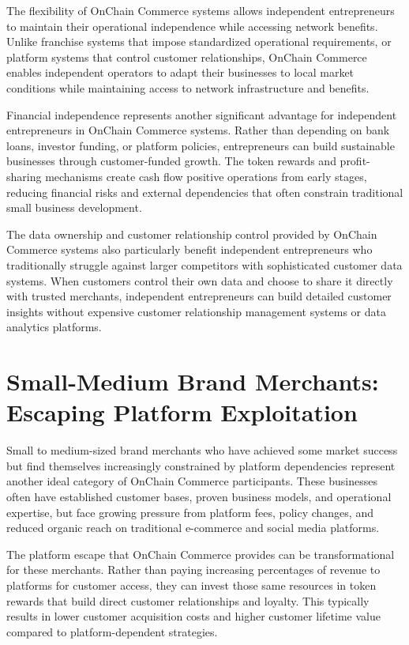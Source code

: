 \documentclass[
  Letterpaper,
]{scrbook}
\begin{document}
The flexibility of OnChain Commerce systems allows independent
entrepreneurs to maintain their operational independence while accessing
network benefits. Unlike franchise systems that impose standardized
operational requirements, or platform systems that control customer
relationships, OnChain Commerce enables independent operators to adapt
their businesses to local market conditions while maintaining access to
network infrastructure and benefits.

Financial independence represents another significant advantage for
independent entrepreneurs in OnChain Commerce systems. Rather than
depending on bank loans, investor funding, or platform policies,
entrepreneurs can build sustainable businesses through customer-funded
growth. The token rewards and profit-sharing mechanisms create cash flow
positive operations from early stages, reducing financial risks and
external dependencies that often constrain traditional small business
development.

The data ownership and customer relationship control provided by OnChain
Commerce systems also particularly benefit independent entrepreneurs who
traditionally struggle against larger competitors with sophisticated
customer data systems. When customers control their own data and choose
to share it directly with trusted merchants, independent entrepreneurs
can build detailed customer insights without expensive customer
relationship management systems or data analytics platforms.

\section{Small-Medium Brand Merchants: Escaping Platform
Exploitation}\label{small-medium-brand-merchants-escaping-platform-exploitation}

Small to medium-sized brand merchants who have achieved some market
success but find themselves increasingly constrained by platform
dependencies represent another ideal category of OnChain Commerce
participants. These businesses often have established customer bases,
proven business models, and operational expertise, but face growing
pressure from platform fees, policy changes, and reduced organic reach
on traditional e-commerce and social media platforms.

The platform escape that OnChain Commerce provides can be
transformational for these merchants. Rather than paying increasing
percentages of revenue to platforms for customer access, they can invest
those same resources in token rewards that build direct customer
relationships and loyalty. This typically results in lower customer
acquisition costs and higher customer lifetime value compared to
platform-dependent strategies.
\end{document}

